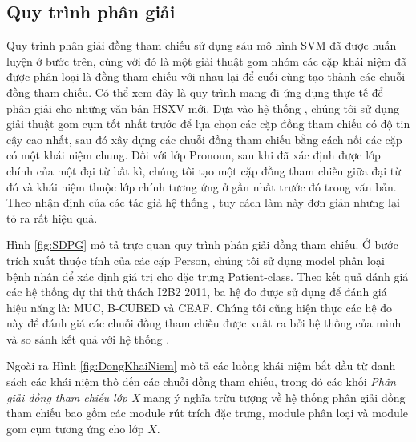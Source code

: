 \subsection*{Quy trình phân giải}
Quy trình phân giải đồng tham chiếu sử dụng sáu mô hình SVM đã được huấn luyện ở bước trên, cùng với đó là một giải thuật gom nhóm các cặp khái niệm đã được phân loại là đồng tham chiếu với nhau lại để cuối cùng tạo thành các chuỗi đồng tham chiếu. Có thể xem đây là quy trình mang đi ứng dụng thực tế để phân giải cho những văn bản HSXV mới. Dựa vào hệ thống \cite{YanXu2012}, chúng tôi sử dụng giải thuật gom cụm tốt nhất trước để lựa chọn các cặp đồng tham chiếu có độ tin cậy cao nhất, sau đó xây dựng các chuỗi đồng tham chiếu bằng cách nối các cặp có một khái niệm chung. Đối với lớp Pronoun, sau khi đã xác định được lớp chính của một đại từ bất kì, chúng tôi tạo một cặp đồng tham chiếu giữa đại từ đó và khái niệm thuộc lớp chính tương ứng ở gần nhất trước đó trong văn bản. Theo nhận định của các tác giả hệ thống \cite{YanXu2012}, tuy cách làm này đơn giản nhưng lại tỏ ra rất hiệu quả.

Hình \ref{fig:SDPG} mô tả trực quan quy trình phân giải đồng tham chiếu. Ở bước trích xuất thuộc tính của các cặp Person, chúng tôi sử dụng model phân loại bệnh nhân để xác định giá trị cho đặc trưng Patient-class. Theo kết quả đánh giá các hệ thống dự thi thử thách I2B2 2011, ba hệ đo được sử dụng để đánh giá hiệu năng là: MUC, B-CUBED và CEAF. Chúng tôi cũng hiện thực các hệ đo này để đánh giá các chuỗi đồng tham chiếu được xuất ra bởi hệ thống của mình và so sánh kết quả với hệ thống \cite{YanXu2012}. 

Ngoài ra Hình \ref{fig:DongKhaiNiem} mô tả các luồng khái niệm bắt đầu từ danh sách các khái niệm thô đến các chuỗi đồng tham chiếu, trong đó các khối \emph{Phân giải đồng tham chiếu lớp X} mang ý nghĩa trừu tượng về hệ thống phân giải đồng tham chiếu bao gồm các module rút trích đặc trưng, module phân loại và module gom cụm tương ứng cho lớp $X$.

